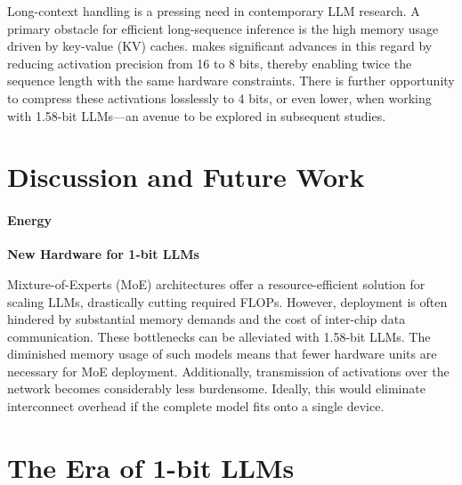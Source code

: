 Long-context handling is a pressing need in contemporary LLM research. A primary obstacle for efficient long-sequence inference is the high memory usage driven by key-value (KV) caches.  makes significant advances in this regard by reducing activation precision from 16 to 8 bits, thereby enabling twice the sequence length with the same hardware constraints. There is further opportunity to compress these activations losslessly to 4 bits, or even lower, when working with 1.58-bit LLMs—an avenue to be explored in subsequent studies.

\section{Discussion and Future Work}

\paragraph{Energy}

\textbf{New Hardware for 1-bit LLMs}

Mixture-of-Experts (MoE) architectures offer a resource-efficient solution for scaling LLMs, drastically cutting required FLOPs. However, deployment is often hindered by substantial memory demands and the cost of inter-chip data communication. These bottlenecks can be alleviated with 1.58-bit LLMs. The diminished memory usage of such models means that fewer hardware units are necessary for MoE deployment. Additionally, transmission of activations over the network becomes considerably less burdensome. Ideally, this would eliminate interconnect overhead if the complete model fits onto a single device.

\section{The Era of 1-bit LLMs}


\begin{abstract}
Building upon advances like BitNet~\cite{bitnet}, the landscape of Large Language Models (LLMs) is shifting towards highly efficient 1-bit representations. In this study, we present a 1-bit LLM variant named \textbf{}, characterized by constraining every model parameter to one of three possible values: \{-1, 0, 1\}. Despite this drastic reduction in precision, our ternary LLM achieves parity with its full-precision Transformer counterpart (using FP16 or BF16) in both perplexity and downstream task accuracy for equivalent model sizes and training data volumes. At the same time, it brings considerable advantages in terms of inference latency, memory utilization, computational throughput, and energy efficiency. Notably, this 1.58-bit representation inspires a novel scaling law and provides a blueprint for the next generation of LLMs that combine high effectiveness with low resource demands. This approach further unlocks a fresh computing paradigm and paves the way for the development of specialized hardware geared towards 1-bit LLM architectures.
\end{abstract}


